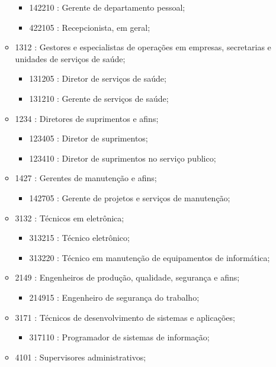 \begin{itemize}
\begin{itemize}
\begin{itemize}
      \item 142210 : Gerente de departamento pessoal;
      \item 422105 : Recepcionista, em geral;
    \end{itemize}
    \item 1312 : Gestores e especialistas de operações em empresas, secretarias e unidades de serviços de saúde;
    \begin{itemize}
      \item 131205 : Diretor de serviços de saúde;
      \item 131210 : Gerente de serviços de saúde;
    \end{itemize}
    \item 1234 : Diretores de suprimentos e afins;
    \begin{itemize}
      \item 123405 : Diretor de suprimentos;
      \item 123410 : Diretor de suprimentos no serviço publico;
    \end{itemize}
    \item 1427 : Gerentes de manutenção e afins;
    \begin{itemize}
      \item 142705 : Gerente de projetos e serviços de manutenção;
    \end{itemize}
    \item 3132 : Técnicos em eletrônica;
    \begin{itemize}
      \item 313215 : Técnico eletrônico;
      \item 313220 : Técnico em manutenção de equipamentos de informática;
    \end{itemize}
    \item 2149 : Engenheiros de produção, qualidade, segurança e afins;
    \begin{itemize}
      \item 214915 : Engenheiro de segurança do trabalho;
    \end{itemize}
    \item 3171 : Técnicos de desenvolvimento de sistemas e aplicações;
    \begin{itemize}
      \item 317110 : Programador de sistemas de informação;
    \end{itemize}
    \item 4101 : Supervisores administrativos;
    \begin{itemize}

\end{itemize}
\end{itemize}
\end{itemize}
